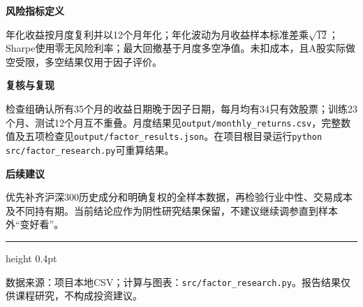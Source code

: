 \documentclass[a4paper,10pt]{article}
\begin{document}
\textbf{风险指标定义}\par
年化收益按月度复利并以12个月年化；年化波动为月收益样本标准差乘$\sqrt{12}$；Sharpe使用零无风险利率；最大回撤基于月度多空净值。未扣成本，且A股实际做空受限，多空结果仅用于因子评价。

\textbf{复核与复现}\par
检查组确认所有35个月的收益日期晚于因子日期，每月均有34只有效股票；训练23个月、测试12个月互不重叠。月度结果见\texttt{output/monthly\_returns.csv}，完整数值及五项检查见\texttt{output/factor\_results.json}。在项目根目录运行\texttt{python src/factor\_research.py}可重算结果。

\textbf{后续建议}\par
优先补齐沪深300历史成分和明确复权的全样本数据，再检验行业中性、交易成本及不同持有期。当前结论应作为阴性研究结果保留，不建议继续调参直到样本外“变好看”。

\vfill
{\color{MemoRule}\hrule height 0.4pt}\medskip
{\footnotesize 数据来源：项目本地CSV；计算与图表：\texttt{src/factor\_research.py}。报告结果仅供课程研究，不构成投资建议。}
\end{document}
